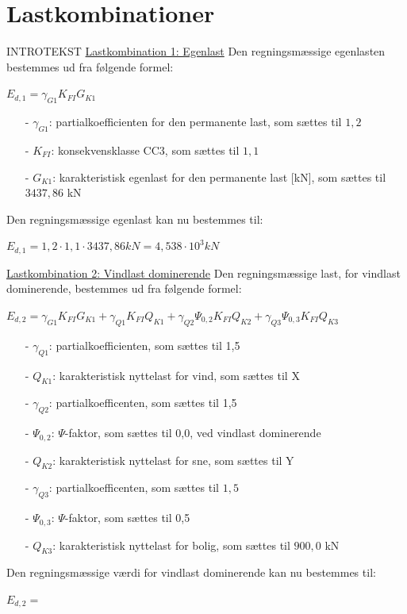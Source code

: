 \section{Lastkombinationer}
INTROTEKST
\newline
\newline
\underline{Lastkombination 1: Egenlast}
\newline
Den regningsmæssige egenlasten bestemmes ud fra følgende formel:
\begin{center}
	$E_{d,1}=\gamma_{G1}K_{FI}G_{K1}$
\end{center}
\begin{itemize}
	\item[-] $\gamma_{G1}$: partialkoefficienten for den permanente last, som sættes til $1,\!2$ \citep[ tabel A 1.2(B+C) anneks A.1.3.1]{EU90}
	\item[-] $K_{FI}$: konsekvensklasse CC3, som sættes til $1,\!1$ \citep[ tabel A 1.2(A) anneks A.1.3.1]{EU90}
	\item[-] $G_{K1}$: karakteristisk egenlast for den permanente last [kN], som sættes til $3437,\!86$ kN
\end{itemize}
Den regningsmæssige egenlast kan nu bestemmes til:
\begin{center}
	$E_{d,1}=1,\!2\cdot 1,1\cdot 3437,\!86 kN=4,\!538\cdot 10^3 kN$
\end{center}
\underline{Lastkombination 2: Vindlast dominerende}
\newline
Den regningsmæssige last, for vindlast dominerende, bestemmes ud fra følgende formel:
\begin{center}
	$E_{d,2}=\gamma_{G1}K_{FI}G_{K1}+\gamma_{Q1}K_{FI}Q_{K1}+\gamma_{Q2}\Psi_{0,2}K_{FI} Q_{K2}+\gamma_{Q3}\Psi_{0,3}K_{FI}Q_{K3}$
\end{center}
\begin{itemize}
	\item[-] $\gamma_{Q1}$: partialkoefficienten, som sættes til 1,5 \citep[ tabel A 1.2(B+C) anneks A.1.3.1]{EU90}
	\item[-] $Q_{K1}$: karakteristisk nyttelast for vind, som sættes til X
	\item[-] $\gamma_{Q2}$: partialkoefficenten, som sættes til 1,5 \citep[ tabel A 1.2(B+C) anneks A.1.3.1]{EU90}
	\item[-] $\Psi_{0,2}$: $\Psi$-faktor, som sættes til 0,0, ved vindlast dominerende \citep[ tabel A 1.1 anneks A.1.2.2]{EU90}
	\item[-] $Q_{K2}$: karakteristisk nyttelast for sne, som sættes til Y
	\item[-] $\gamma_{Q3}$: partialkoefficenten, som sættes til $1,\!5$ \citep[ tabel A 1.2(B+C) anneks A.1.3.1]{EU90}
	\item[-] $\Psi_{0,3}$: $\Psi$-faktor, som sættes til 0,5 \citep[ tabel A 1.1 anneks A.1.2.2]{EU90}
	\item[-] $Q_{K3}$: karakteristisk nyttelast for bolig, som sættes til $900,\!0$ kN
\end{itemize}
Den regningsmæssige værdi for vindlast dominerende kan nu bestemmes til:
\begin{center}
	$E_{d,2}=$
\end{center}

